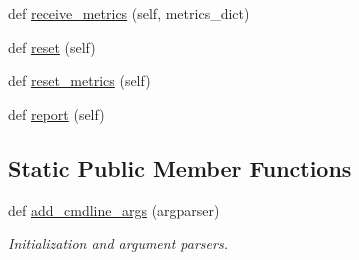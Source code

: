 \begin{DoxyCompactItemize}
def \hyperlink{classtransresnet__multimodal_1_1transresnet__multimodal_1_1TransresnetMultimodalAgent_ad48a1d1a6a59a8bc2cef782de992af5a}{receive\+\_\+metrics} (self, metrics\+\_\+dict)
\item 
def \hyperlink{classtransresnet__multimodal_1_1transresnet__multimodal_1_1TransresnetMultimodalAgent_a00c3b4f89a4a7538ffa3be4d7abaf73e}{reset} (self)
\item 
def \hyperlink{classtransresnet__multimodal_1_1transresnet__multimodal_1_1TransresnetMultimodalAgent_a4c4ac71e3a1844f6576f66f64896153f}{reset\+\_\+metrics} (self)
\item 
def \hyperlink{classtransresnet__multimodal_1_1transresnet__multimodal_1_1TransresnetMultimodalAgent_a3cae694653b6742f5946b33828a4e641}{report} (self)
\end{DoxyCompactItemize}
\subsection*{Static Public Member Functions}
\begin{DoxyCompactItemize}
\item 
def \hyperlink{classtransresnet__multimodal_1_1transresnet__multimodal_1_1TransresnetMultimodalAgent_ae30fd68376b12a3264e95c8e607df102}{add\+\_\+cmdline\+\_\+args} (argparser)
\begin{DoxyCompactList}\small\item\em Initialization and argument parsers. \end{DoxyCompactList}\end{DoxyCompactItemize}

